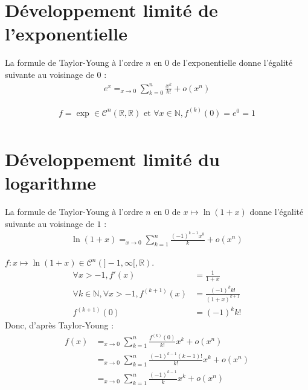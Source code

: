 \documentclass[../main.tex]{subfiles}
\begin{document}
\section{Développement limité de l'exponentielle}
\begin{tcolorbox}[title=Propostion 25.28, title filled=false, colframe=lightblue, colback=lightblue!10!white]
    La formule de Taylor-Young à l'ordre $n$ en $0$ de l'exponentielle donne l'égalité suivante au voisinage de $0$ :
    \begin{align*}
        e^x=_{x\to 0} \sum_{k=0}^{n} \frac{x^k}{k!} + o(x^n)
    \end{align*}
\end{tcolorbox}

\begin{align*}
    f = \exp \in \mathcal{C}^n(\mathbb{R}, \mathbb{R}) \text{ et } \forall x \in \mathbb{N}, f^{(k)}(0) = e^0 = 1 \\
\end{align*}

\section{Développement limité du logarithme}
\begin{tcolorbox}[title=Propostion 25.29, title filled=false, colframe=lightblue, colback=lightblue!10!white]
    La formule de Taylor-Young à l'ordre $n$ en $0$ de $x\mapsto \ln (1 + x)$ donne l'égalité suivante au voisinage de $1$ :
    \begin{align*}
        \ln (1 + x) =_{x\to 0} \sum_{k=1}^{n} \frac{(-1)^{k-1}x^k}{k} + o(x^n)
    \end{align*}
\end{tcolorbox}

\noindent $f:x\mapsto \ln(1+x) \in \mathcal{C}^n(]-1, \infty[, \mathbb{R})$. \\
\begin{align*}
    \forall x > -1, f'(x) &= \frac{1}{1+x} \\
    \forall k \in \mathbb{N}, \forall x > -1, f^{(k+1)}(x) &= \frac{(-1)^k k!}{(1+x)^{k+1}} \\
    f^{(k+1)}(0) &= (-1)^k k!
\end{align*}
Donc, d'après Taylor-Young :
\begin{align*}
    f(x) &=_{x\to 0} \sum_{k=1}^{n} \frac{f^{(k)}(0)}{k!}x^k + o(x^n) \\
    &=_{x\to 0} \sum_{k=1}^{n} \frac{(-1)^{k-1}(k-1)!}{k!}x^k + o(x^n) \\
    &=_{x\to 0} \sum_{k=1}^{n} \frac{(-1)^{k-1}}{k}x^k + o(x^n)
\end{align*}
\end{document}
